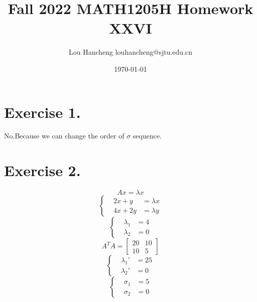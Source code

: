 \documentclass[12pt, a4paper, oneside]{article}
\title{Fall 2022 MATH1205H Homework XXVI}
\author{Lou Hancheng \quad louhancheng@sjtu.edu.cn}
\date{\today}
\begin{document}
    \maketitle
    \section*{Exercise 1.}
        No.Because we can change the order of $\sigma$ sequence.
    \section*{Exercise 2.}
        $$
            Ax=\lambda x
        $$
        $$
            \left\{\begin{aligned}
                & 2x + y &= \lambda x\\
                & 4x + 2y &= \lambda y
            \end{aligned}\right.
        $$
        $$
            \left\{\begin{aligned}
                & \lambda_1 &= 4\\
                & \lambda_2 &= 0
            \end{aligned}\right.
        $$
        $$
            A^TA=\begin{bmatrix}
                20 & 10\\
                10 & 5
            \end{bmatrix}
        $$
        $$
            \left\{\begin{aligned}
                & \lambda_1' &= 25\\
                & \lambda_2' &= 0
            \end{aligned}\right.
        $$
        $$
            \left\{\begin{aligned}
                & \sigma_1 &= 5\\
                & \sigma_2 &= 0
            \end{aligned}\right.
        $$
\end{document}
